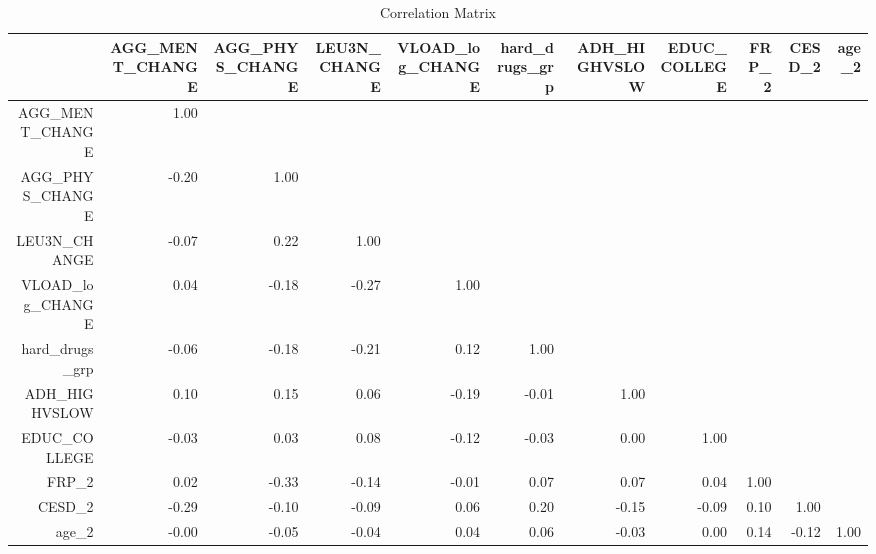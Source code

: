 \begin{table}[ht]
\centering
\begin{tabular}{rrrrrrrrrrr}
  \hline
 & AGG\_MENT\_CHANGE & AGG\_PHYS\_CHANGE & LEU3N\_CHANGE & VLOAD\_log\_CHANGE & hard\_drugs\_grp & ADH\_HIGHVSLOW & EDUC\_COLLEGE & FRP\_2 & CESD\_2 & age\_2 \\ 
  \hline
AGG\_MENT\_CHANGE & 1.00 &  &  &  &  &  &  &  &  &  \\ 
  AGG\_PHYS\_CHANGE & -0.20 & 1.00 &  &  &  &  &  &  &  &  \\ 
  LEU3N\_CHANGE & -0.07 & 0.22 & 1.00 &  &  &  &  &  &  &  \\ 
  VLOAD\_log\_CHANGE & 0.04 & -0.18 & -0.27 & 1.00 &  &  &  &  &  &  \\ 
  hard\_drugs\_grp & -0.06 & -0.18 & -0.21 & 0.12 & 1.00 &  &  &  &  &  \\ 
  ADH\_HIGHVSLOW & 0.10 & 0.15 & 0.06 & -0.19 & -0.01 & 1.00 &  &  &  &  \\ 
  EDUC\_COLLEGE & -0.03 & 0.03 & 0.08 & -0.12 & -0.03 & 0.00 & 1.00 &  &  &  \\ 
  FRP\_2 & 0.02 & -0.33 & -0.14 & -0.01 & 0.07 & 0.07 & 0.04 & 1.00 &  &  \\ 
  CESD\_2 & -0.29 & -0.10 & -0.09 & 0.06 & 0.20 & -0.15 & -0.09 & 0.10 & 1.00 &  \\ 
  age\_2 & -0.00 & -0.05 & -0.04 & 0.04 & 0.06 & -0.03 & 0.00 & 0.14 & -0.12 & 1.00 \\ 
   \hline
\end{tabular}
\caption{Correlation Matrix} 
\label{tab:correlation}
\end{table}
